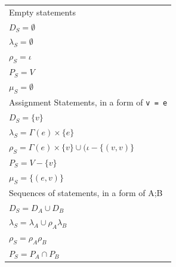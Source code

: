 \documentclass[oneside,12pt,a4paper]{book}
\begin{document}
 \begin{table}[h]
  \centering
  	\begin{tabular}{l}
Empty statements                                                                            \\
$D_S = \emptyset$                                                                           \\
$\lambda_S = \emptyset$                                                                     \\
$\rho_S = \iota$                                                                            \\
$P_S = V$                                                                                   \\
$\mu_S = \emptyset$                                                                         \\
\hline                                                                                      
Assignment Statements, in a form of \texttt{v = e}                                          \\
$D_S = \{v\}$                                                                               \\
$\lambda_S = \Gamma(e) \times \{e\}$                                                        \\
$\rho_S = \Gamma(e) \times \{v\} \cup (\iota - \{(v,v)\}$                                   \\
$P_S = V - \{v\}$                                                                           \\
$\mu_S = \{(e,v)\}$                                                                         \\
\hline                                                                                      
Sequences of statements, in a form of A;B                                                   \\
$D_S = D_A \cup D_B$                                                                        \\
$\lambda_S = \lambda_A \cup \rho_A\lambda_B$                                                \\
$\rho_S = \rho_A\rho_B$                                                                     \\
$P_S = P_A \cap P_B$                                                                        \\

\end{tabular}
\end{table}
\end{document}
